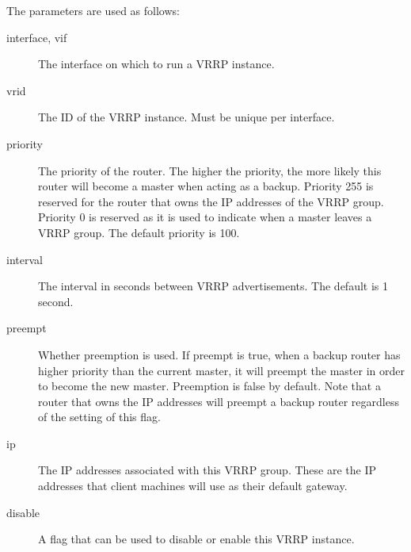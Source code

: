 \vspace{0.1in}                              
\noindent{}
\vspace{0.1in}

\noindent
The parameters are used as follows:
\begin{description}
\item[interface, vif] The interface on which to run a VRRP instance.

\item[vrid] The ID of the VRRP instance.  Must be unique per interface.

\item[priority] The priority of the router.  The higher the priority, the more
likely this router will become a master when acting as a backup.  Priority 255
is reserved for the router that owns the IP addresses of the VRRP group.
Priority 0 is reserved as it is used to indicate when a master leaves a VRRP
group.  The default priority is 100.

\item[interval]  The interval in seconds between VRRP advertisements.  The
default is 1 second.

\item[preempt]  Whether preemption is used.  If preempt is true, when a backup
router has higher priority than the current master, it will preempt the master
in order to become the new master.  Preemption is false by default.  Note that a
router that owns the IP addresses will preempt a backup router regardless of the
setting of this flag.

\item[ip]  The IP addresses associated with this VRRP group.  These are the IP
addresses that client machines will use as their default gateway.

\item[disable]  A flag that can be used to disable or enable this VRRP instance.
\end{description}

